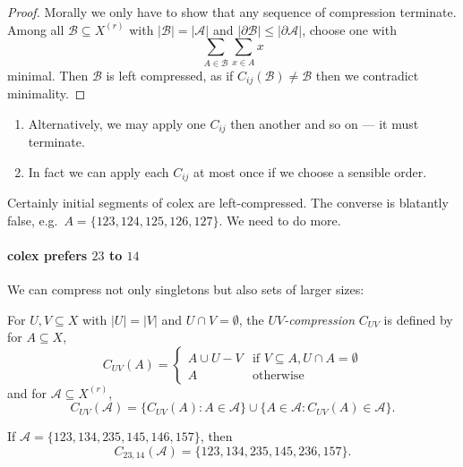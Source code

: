 \documentclass[a4paper]{article}
\newcommand{\shadow}{\partial}
\begin{document}
\begin{proof}
  Morally we only have to show that any sequence of compression terminate. Among all \(\mathcal B \subseteq X^{(r)}\) with \(|\mathcal B| = |\mathcal A|\) and \(|\shadow \mathcal B| \leq |\shadow \mathcal A|\), choose one with
  \[
    \sum_{A \in \mathcal B} \sum_{x \in A} x
  \]
  minimal. Then \(\mathcal B\) is left compressed, as if \(C_{ij}(\mathcal B) \neq \mathcal B\) then we contradict minimality.
\end{proof}

\begin{note}\leavevmode
  \begin{enumerate}
  \item Alternatively, we may apply one \(C_{ij}\) then another and so on --- it must terminate.
  \item In fact we can apply each \(C_{ij}\) at most once if we choose a sensible order.
  \end{enumerate}
\end{note}

Certainly initial segments of colex are left-compressed. The converse is blatantly false, e.g.\ \(A = \{123, 124, 125, 126, 127\}\). We need to do more.

\paragraph{colex prefers \(23\) to \(14\)}

We can compress not only singletons but also sets of larger sizes:

\begin{definition}[\(UV\)-compression]
  For \(U, V \subseteq X\) with \(|U| = |V|\) and \(U \cap V = \emptyset\), the \emph{\(UV\)-compression} \(C_{UV}\) is defined by for \(A \subseteq X\),
  \[
    C_{UV} (A) =
    \begin{cases}
      A \cup U - V & \text{if } V \subseteq A, U \cap A = \emptyset \\
      A & \text{otherwise}
    \end{cases}
  \]
  and for \(\mathcal A \subseteq X^{(r)}\),
  \[
    C_{UV} (\mathcal A) = \{C_{UV}(A): A \in \mathcal A\} \cup \{A \in \mathcal A: C_{UV}(A) \in \mathcal A\}.
  \]
\end{definition}

\begin{eg}
  If \(\mathcal A = \{123, 134, 235, 145, 146, 157\}\), then
  \[
    C_{23, 14}(\mathcal A) = \{123, 134, 235, 145, 236, 157\}.
  \]
\end{eg}
\end{document}
